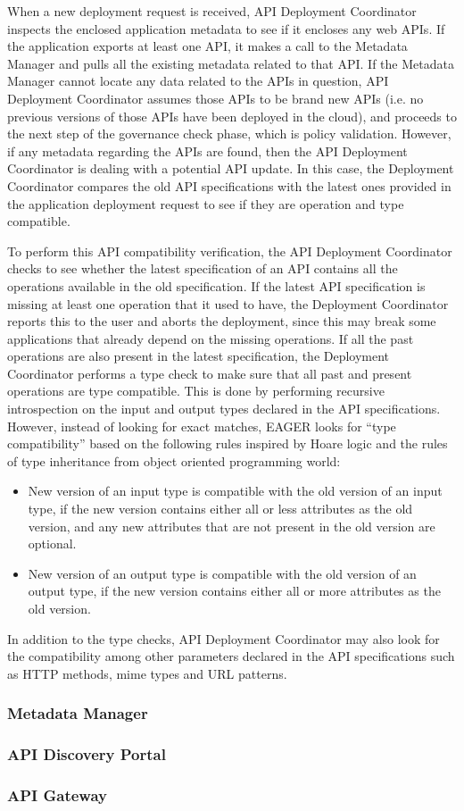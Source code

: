 When a new deployment request is received, API Deployment Coordinator inspects the enclosed application metadata to see if it encloses any web
APIs. If the application exports at least one API, it makes a call to the Metadata Manager and pulls all the existing metadata related to that API. If
the Metadata Manager cannot locate any data related to the APIs in question, API Deployment Coordinator assumes those APIs to be brand new
APIs (i.e. no previous versions of those APIs have been deployed in the cloud), and proceeds to the next step of the governance check phase, which is policy
validation. However, if any metadata regarding the APIs are found, then the API Deployment Coordinator is dealing with a potential API update. In this
case, the Deployment Coordinator compares the old API specifications with the latest ones provided in the application deployment request to see if
they are operation and type compatible.

To perform this API compatibility verification, the API Deployment Coordinator checks to see whether the latest specification of an API contains all 
the operations available in the old specification. If the latest API specification is missing at least one operation that it used to have, the Deployment Coordinator
reports this to the user and aborts the deployment, since this may break some applications that already depend on the missing operations. 
If all the past operations are also present in the latest specification, the Deployment Coordinator performs a type check to make sure that 
all past and present operations are type compatible. This is done by performing recursive introspection on the input and output types declared in the
API specifications. However, instead of looking for exact matches, EAGER looks for ``type compatibility'' based on the following rules inspired by Hoare
logic and the rules of type inheritance from object oriented programming world:
\begin{itemize}
\item New version of an input type is compatible with the old version of an input type, if the new version contains either all or less attributes as the 
old version, and any new attributes that are not present in the old version are optional.
\item New version of an output type is compatible with the old version of an output type, if the new version contains either all or more attributes as the 
old version.
\end{itemize}
In addition to the type checks, API Deployment Coordinator may also look for the compatibility among other parameters declared in the API specifications
such as HTTP methods, mime types and URL patterns.


\subsubsection{Metadata Manager}
\subsubsection{API Discovery Portal}
\subsubsection{API Gateway}